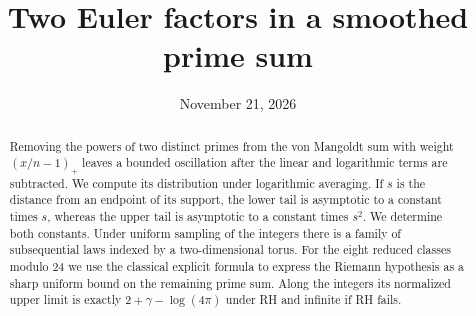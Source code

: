 \documentclass[11pt]{article}
\title{\bfseries Two Euler factors in a smoothed prime sum}
\author{}
\date{\normalsize November 21, 2026}
\numberwithin{equation}{section}
\begin{document}
\maketitle
\begin{abstract}
Removing the powers of two distinct primes from the von Mangoldt sum
with weight $(x/n-1)_+$ leaves a bounded oscillation after the linear
and logarithmic terms are subtracted. We compute its distribution under
logarithmic averaging. If $s$ is the distance from an endpoint of its
support, the lower tail is asymptotic to a constant times $s$, whereas
the upper tail is asymptotic to a constant times $s^2$. We determine
both constants. Under uniform sampling of the integers there is a
family of subsequential laws indexed by a two-dimensional torus.
For the eight reduced classes modulo $24$ we use the classical explicit
formula to express the Riemann hypothesis as a sharp uniform bound
on the remaining prime sum. Along the integers its normalized upper
limit is exactly $2+\gamma-\log(4\pi)$ under RH and infinite if RH fails.
\end{abstract}






\end{document}
